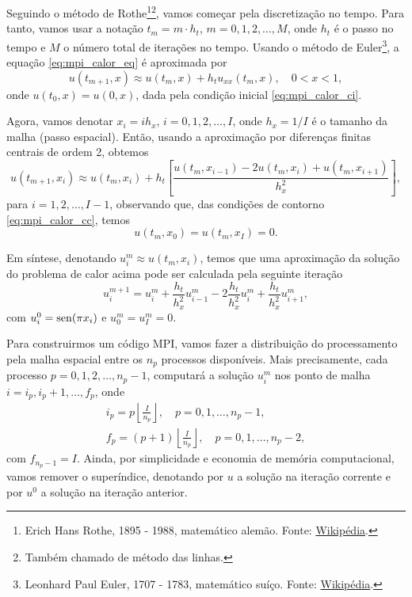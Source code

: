 Seguindo o método de Rothe\footnote{Erich Hans Rothe, 1895 - 1988, matemático alemão. Fonte: \href{https://pt.wikipedia.org/wiki/Erich_Rothe}{Wikipédia}.}\footnote{Também chamado de método das linhas.}, vamos começar pela discretização no tempo. Para tanto, vamos usar a notação $t_m = m\cdot h_t$, $m=0,1,2,\dotsc,M$, onde $h_t$ é o passo no tempo e $M$ o número total de iterações no tempo. Usando o método de Euler\footnote{Leonhard Paul Euler, 1707 - 1783, matemático suíço. Fonte: \href{https://pt.wikipedia.org/wiki/Leonhard_Euler}{Wikipédia}.}, a equação \eqref{eq:mpi_calor_eq} é aproximada por
\begin{equation}\label{eq:mpi_color_eq_euler}
  u(t_{m+1}, x) \approx u(t_m, x) + h_t u_{xx}(t_m, x),\quad 0<x<1,
\end{equation}
onde $u(t_0, x) = u(0, x)$, dada pela condição inicial \eqref{eq:mpi_calor_ci}.

Agora, vamos denotar $x_i=ih_x$, $i=0,1,2,\dotsc,I$, onde $h_x=1/I$ é o tamanho da malha (passo espacial). Então, usando a aproximação por diferenças finitas centrais de ordem 2, obtemos
\begin{equation}
  u(t_{m+1}, x_i) \approx u(t_m, x_i) + h_t \left[\frac{u(t_m,x_{i-1}) - 2u(t_m, x_i) + u(t_m, x_{i+1})}{h_x^2}\right],
\end{equation}
para $i=1,2,\dotsc,I-1$, observando que, das condições de contorno \eqref{eq:mpi_calor_cc}, temos
\begin{equation}
  u(t_m, x_0) = u(t_m, x_I) = 0.
\end{equation}

Em síntese, denotando $u^m_i \approx u(t_m, x_i)$, temos que uma aproximação da solução do problema de calor acima pode ser calculada pela seguinte iteração
\begin{equation}
  u^{m+1}_i = u^m_i + \frac{h_t}{h_x^2}u^m_{i-1} - 2\frac{h_t}{h_x^2}u^m_{i} + \frac{h_t}{h_x^2}u^m_{i+1},
\end{equation}
com $u^0_i = \operatorname{sen}(\pi x_i)$ e $u^m_0=u^m_I = 0$.

Para construirmos um código MPI, vamos fazer a distribuição do processamento pela malha espacial entre os $n_p$ processos disponíveis. Mais precisamente, cada processo $p = 0, 1, 2, \dotsc, n_p-1$, computará a solução $u^m_i$ nos ponto de malha $i=i_p, i_p+1, \dotsc, f_p$, onde
\begin{gather}
  i_p = p\left\lfloor\frac{I}{n_p}\right\rfloor, \quad p=0,1,\dotsc,n_p-1,\\
  f_p = (p+1)\left\lfloor\frac{I}{n_p}\right\rfloor,\quad p=0,1,\dotsc,n_p-2,
\end{gather}
com $f_{n_p-1}=I$. Ainda, por simplicidade e economia de memória computacional, vamos remover o superíndice, denotando por $u$ a solução na iteração corrente e por $u^0$ a solução na iteração anterior.

